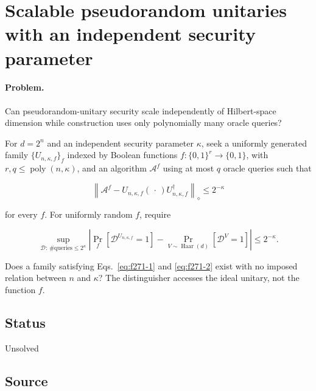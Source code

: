 \section{Scalable pseudorandom unitaries with an independent security parameter}
\label{sec:op_f271040c57d9a513}

\paragraph{Problem.}
Can pseudorandom-unitary security scale independently of Hilbert-space dimension while construction uses only polynomially many oracle queries?

For $d=2^n$ and an independent security parameter $\kappa$, seek a uniformly generated family $\{U_{n,\kappa,f}\}_f$ indexed by Boolean functions $f:\{0,1\}^r\to\{0,1\}$, with $r,q\leq\operatorname{poly}(n,\kappa)$, and an algorithm $\mathcal A^f$ using at most $q$ oracle queries such that

\begin{equation}
\left\|\mathcal A^f-U_{n,\kappa,f}(\,\cdot\,)U_{n,\kappa,f}^\dagger\right\|_\diamond
\leq2^{-\kappa}
\label{eq:f271-1}
\end{equation}

for every $f$. For uniformly random $f$, require

\begin{equation}
\sup_{\mathcal D:\,\#\mathrm{queries}\leq2^\kappa}
\left|\Pr_f[\mathcal D^{U_{n,\kappa,f}}=1]
-\Pr_{V\sim\operatorname{Haar}(d)}[\mathcal D^V=1]\right|
\leq2^{-\kappa}.
\label{eq:f271-2}
\end{equation}

Does a family satisfying Eqs.~\eqref{eq:f271-1} and \eqref{eq:f271-2} exist with no imposed relation between $n$ and $\kappa$? The distinguisher accesses the ideal unitary, not the function $f$.

\subsection*{Status}

Unsolved

\subsection*{Source}


